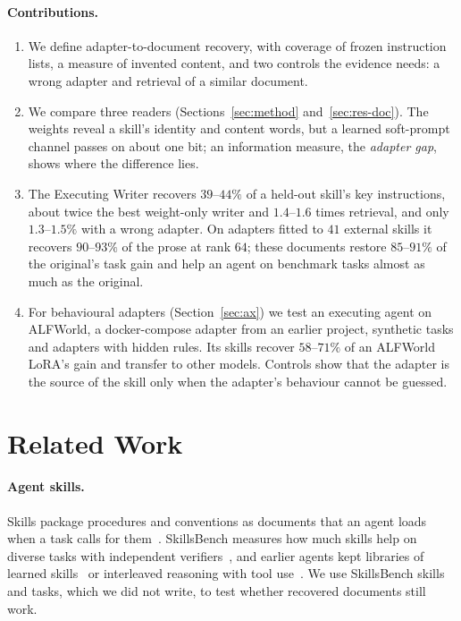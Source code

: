 \documentclass[11pt]{article}
\begin{document}
\paragraph{Contributions.}
\begin{enumerate}[leftmargin=*]
\item We define adapter-to-document recovery, with coverage of frozen instruction lists, a measure of invented content, and two controls
the evidence needs: a wrong adapter and retrieval of a similar document.
\item We compare three readers (Sections~\ref{sec:method} and~\ref{sec:res-doc}). The weights reveal a skill's identity and content words,
but a learned soft-prompt channel passes on about one bit; an information measure, the \emph{adapter gap}, shows where the difference lies.
\item The Executing Writer recovers $39$--$44\%$ of a held-out skill's key instructions, about twice the best weight-only writer and $1.4$--$1.6$ times retrieval, and only
$1.3$--$1.5\%$ with a wrong adapter. On adapters fitted to $41$ external skills it recovers $90$--$93\%$ of the prose at rank $64$; these
documents restore $85$--$91\%$ of the original's task gain and help an agent on benchmark tasks almost as much as the original.
\item For behavioural adapters (Section~\ref{sec:ax}) we test an executing agent on ALFWorld, a docker-compose adapter from an earlier project, synthetic tasks and
adapters with hidden rules. Its skills recover $58$--$71\%$ of an ALFWorld LoRA's gain and transfer to other models. Controls show that the
adapter is the source of the skill only when the adapter's behaviour cannot be guessed.
\end{enumerate}

\section{Related Work}

\paragraph{Agent skills.} Skills package procedures and conventions as documents that an agent loads when a task calls for
them~\cite{anthropicskills}. SkillsBench measures how much skills help on diverse tasks with independent verifiers~\cite{skillsbench}, and
earlier agents kept libraries of learned skills~\cite{voyager} or interleaved reasoning with tool use~\cite{react,sweagent}. We use
SkillsBench skills and tasks, which we did not write, to test whether recovered documents still work.
\end{document}
